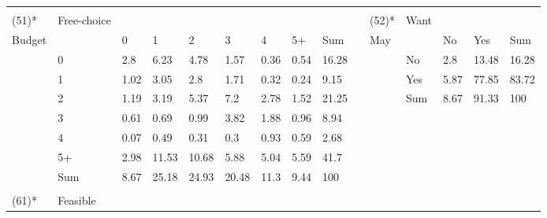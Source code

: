 \begin{center}
\begin{landscape}
\begin{longtable}{lllllllllllllll}
  &
    &
    &
    &
    &
    &
    &
    &
    &
    &
    &
    &
    &
    &
    \\
(51)* &
  Free-choice &
   &
   &
   &
   &
   &
   &
    &
   &
  (52)* &
  Want &
   &
   &
    \\
Budget &
   &
  0 &
  1 &
  2 &
  3 &
  4 &
  5+ &
  Sum &
    &
  May &
   &
  No &
  Yes &
  Sum \\
 &
  0 &
  \cellcolor[HTML]{EAEAEA}2.8 &
  \cellcolor[HTML]{D0D0D0}6.23 &
  \cellcolor[HTML]{DBDBDB}4.78 &
  \cellcolor[HTML]{F4F4F4}1.57 &
  \cellcolor[HTML]{FDFDFD}0.36 &
  \cellcolor[HTML]{FCFCFC}0.54 &
  16.28 &
   &
   &
  No &
  \cellcolor[HTML]{FFFFFF}2.8 &
  \cellcolor[HTML]{F3F3F3}13.48 &
  16.28 \\
 &
  1 &
  \cellcolor[HTML]{F8F8F8}1.02 &
  \cellcolor[HTML]{E8E8E8}3.05 &
  \cellcolor[HTML]{EAEAEA}2.8 &
  \cellcolor[HTML]{F3F3F3}1.71 &
  \cellcolor[HTML]{FEFEFE}0.32 &
  \cellcolor[HTML]{FEFEFE}0.24 &
  9.15 &
   &
   &
  Yes &
  \cellcolor[HTML]{FCFCFC}5.87 &
  \cellcolor[HTML]{A6A6A6}77.85 &
  83.72 \\
 &
  2 &
  \cellcolor[HTML]{F7F7F7}1.19 &
  \cellcolor[HTML]{E7E7E7}3.19 &
  \cellcolor[HTML]{D6D6D6}5.37 &
  \cellcolor[HTML]{C8C8C8}7.2 &
  \cellcolor[HTML]{EAEAEA}2.78 &
  \cellcolor[HTML]{F4F4F4}1.52 &
  21.25 &
   &
   &
  Sum &
  8.67 &
  91.33 &
  100 \\
 &
  3 &
  \cellcolor[HTML]{FBFBFB}0.61 &
  \cellcolor[HTML]{FBFBFB}0.69 &
  \cellcolor[HTML]{F8F8F8}0.99 &
  \cellcolor[HTML]{E2E2E2}3.82 &
  \cellcolor[HTML]{F1F1F1}1.88 &
  \cellcolor[HTML]{F9F9F9}0.96 &
  8.94 &
   &
   &
   &
   &
   &
    \\
 &
  4 &
  \cellcolor[HTML]{FFFFFF}0.07 &
  \cellcolor[HTML]{FCFCFC}0.49 &
  \cellcolor[HTML]{FEFEFE}0.31 &
  \cellcolor[HTML]{FEFEFE}0.3 &
  \cellcolor[HTML]{F9F9F9}0.93 &
  \cellcolor[HTML]{FBFBFB}0.59 &
  2.68 &
   &
   &
   &
   &
   &
    \\
 &
  5+ &
  \cellcolor[HTML]{E9E9E9}2.98 &
  \cellcolor[HTML]{A6A6A6}11.53 &
  \cellcolor[HTML]{ADADAD}10.68 &
  \cellcolor[HTML]{D2D2D2}5.88 &
  \cellcolor[HTML]{D9D9D9}5.04 &
  \cellcolor[HTML]{D5D5D5}5.59 &
  41.7 &
   &
   &
   &
   &
   &
    \\
  &
  Sum &
  8.67 &
  25.18 &
  24.93 &
  20.48 &
  11.3 &
  9.44 &
  100 &
    &
    &
    &
    &
    &
    \\
  &
    &
    &
    &
    &
    &
    &
    &
    &
    &
    &
    &
    &
    &
    \\
(61)* &
  Feasible &
   &
   &
   &

\end{longtable}
\end{landscape}
\end{center}
